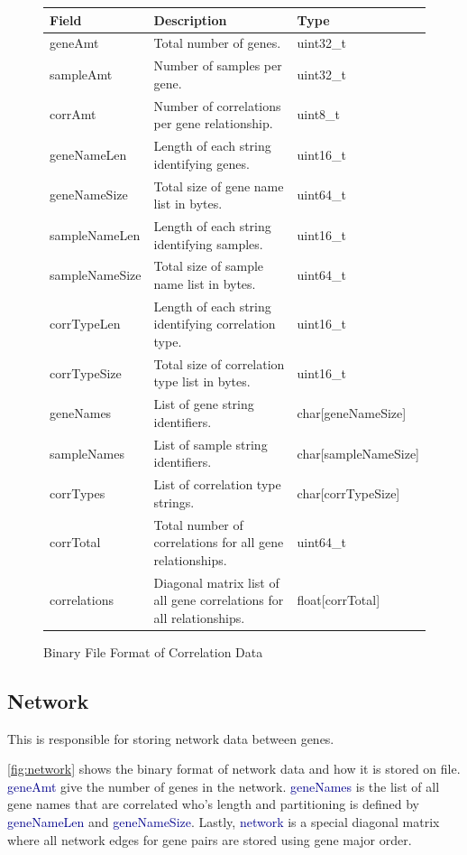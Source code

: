 \documentclass[10pt]{article}
\providecommand{\h}[1]{\textcolor{darkblue}{#1}}
\begin{document}
\begin{figure}[H]
\centering
\begin{tabularx}{\textwidth}{|l|X|l|}
\hline
\textbf{Field} & \textbf{Description} & \textbf{Type} \\
\hline
geneAmt & Total number of genes. & uint32\_t \\
\hline
sampleAmt & Number of samples per gene. & uint32\_t \\
\hline
corrAmt & Number of correlations per gene relationship. & uint8\_t \\
\hline
geneNameLen & Length of each string identifying genes. & uint16\_t \\
\hline
geneNameSize & Total size of gene name list in bytes. & uint64\_t \\
\hline
sampleNameLen & Length of each string identifying samples. & uint16\_t \\
\hline
sampleNameSize & Total size of sample name list in bytes. & uint64\_t \\
\hline
corrTypeLen & Length of each string identifying correlation type. & uint16\_t \\
\hline
corrTypeSize & Total size of correlation type list in bytes. & uint16\_t \\
\hline
geneNames & List of gene string identifiers. & char[geneNameSize] \\
\hline
sampleNames & List of sample string identifiers. & char[sampleNameSize] \\
\hline
corrTypes & List of correlation type strings. & char[corrTypeSize] \\
\hline
corrTotal & Total number of correlations for all gene relationships. & 
uint64\_t \\
\hline
correlations & Diagonal matrix list of all gene correlations for all 
relationships. & float[corrTotal] \\
\hline
\end{tabularx}
\caption{Binary File Format of Correlation Data}
\label{fig:correlation}
\end{figure}

\subsection{Network}

This is responsible for storing network data between genes.

\autoref{fig:network} shows the binary format of network data and how it is 
stored on file. \h{geneAmt} give the number of genes in the network. 
\h{geneNames} is the list of all gene names that are correlated who's length and 
partitioning is defined by \h{geneNameLen} and \h{geneNameSize}. Lastly, 
\h{network} is a special diagonal matrix where all network edges for gene pairs 
are stored using gene major order.
\end{document}
